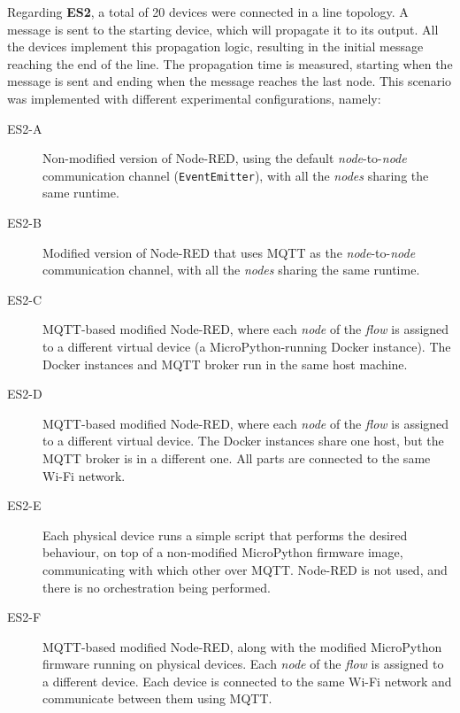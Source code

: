 Regarding \textbf{ES2}, a total of 20 devices were connected in a line topology. A message is sent to the starting device, which will propagate it to its output. All the devices implement this propagation logic, resulting in the initial message reaching the end of the line. The propagation time is measured, starting when the message is sent and ending when the message reaches the last node. This scenario was implemented with different experimental configurations, namely:
\begin{description}
    \item[ES2-A] Non-modified version of Node-RED, using the default \textit{node}-to-\textit{node} communication channel (\texttt{EventEmitter}), with all the \textit{nodes} sharing the same runtime.
    
    \item[ES2-B] Modified version of Node-RED that uses MQTT as the \textit{node}-to-\textit{node} communication channel, with all the \textit{nodes} sharing the same runtime.
    
    \item[ES2-C] MQTT-based modified Node-RED, where each \textit{node} of the \textit{flow} is assigned to a different virtual device (\ie a MicroPython-running Docker instance). The Docker instances and MQTT broker run in the same host machine.
    
    \item[ES2-D] MQTT-based modified Node-RED, where each \textit{node} of the \textit{flow} is assigned to a different virtual device. The Docker instances share one host, but the MQTT broker is in a different one. All parts are connected to the same Wi-Fi network.
    
    \item[ES2-E] Each physical device runs a simple script that performs the desired behaviour, on top of a non-modified MicroPython firmware image, communicating with which other over MQTT. Node-RED is not used, and there is no orchestration being performed.

    \item[ES2-F] MQTT-based modified Node-RED, along with the modified MicroPython firmware running on physical devices. Each \textit{node} of the \textit{flow} is assigned to a different device. Each device is connected to the same Wi-Fi network and communicate between them using MQTT. 
\end{description}


